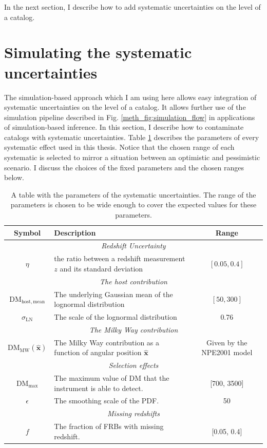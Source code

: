 In the next section, I describe how to add systematic uncertainties on the level of a catalog.

\section{Simulating the systematic uncertainties} \label{meth_sec:uncertainties}
The simulation-based approach which I am using here allows easy integration of systematic uncertainties on the level of a catalog. It allows further use of the simulation pipeline described in Fig. \ref{meth_fig:simulation_flow} in applications of simulation-based inference. In this section, I describe how to contaminate catalogs with systematic uncertainties. Table \ref{tab:systematics} describes the parameters of every systematic effect used in this thesis. Notice that the chosen range of each systematic is selected to mirror a situation between an optimistic and pessimistic scenario. I discuss the choices of the fixed parameters and the chosen ranges below.




\begin{table}[h]
\centering

\begin{tabular}{c p{8cm} c}
\hline\hline
\textbf{Symbol} & \textbf{Description} & \textbf{Range} \\
\hline
\multicolumn{3}{c}{\textit{Redshift Uncertainty}} \\
\hline
$\eta$ & the ratio between a redshift measurement $z$ and its standard deviation& $[0.05, 0.4]$\\
\hline
\multicolumn{3}{c}{\textit{The host contribution}} \\
\hline
$\mathrm{DM}_\mathrm{host, mean}$ & The underlying Gaussian mean of the lognormal distribution & $[50, 300]$\\
$\sigma_\mathrm{LN}$ & The scale of the lognormal distribution& 0.76\\
\hline
\multicolumn{3}{c}{\textit{The Milky Way contribution}} \\
\hline
$\mathrm{DM}_\mathrm{MW}(\mathbf{\hat{x}})$ & The Milky Way contribution as a function of angular position $\mathbf{\hat{x}}$ & Given by the NPE2001 model \\
\hline
\multicolumn{3}{c}{\textit{Selection effects}} \\
\hline
$\mathrm{DM}_\mathrm{max}$ & The maximum value of DM that the instrument is able to detect. & [700, 3500]\\
$\epsilon$ & The smoothing scale of the PDF. & 50\\
\hline
\multicolumn{3}{c}{\textit{Missing redshifts}} \\
\hline
$f$ & The fraction of FRBs with missing redshift. & [0.05, 0.4]\\
\hline\hline
\end{tabular}
\caption{A table with the parameters of the systematic uncertainties. The range of the parameters is chosen to be wide enough to cover the expected values for these parameters. }
\label{tab:systematics}
\end{table}




